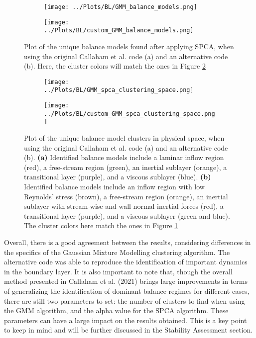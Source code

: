 \documentclass[12pt]{report} %
\begin{document}
\begin{figure}[htbp]
  \centering
  \begin{subfigure}[b]{0.45\textwidth}
      \texttt{[image: ../Plots/BL/GMM\_balance\_models.png]}
      \caption{}
  \end{subfigure}
  \hfill
  \begin{subfigure}[b]{0.45\textwidth}
      \texttt{[image: ../Plots/BL/custom\_GMM\_balance\_models.png]}
      \caption{}
  \end{subfigure}
  \caption{Plot of the unique balance models found after applying SPCA, when using the original Callaham et al. code (a) and an alternative code (b). Here, the cluster colors will match the ones in Figure \ref{fig:balance_model_clusters}}
  \label{fig:balance_models}
\end{figure}


\begin{figure}[htbp]
  \centering
  \begin{subfigure}[b]{0.7\textwidth}
      \texttt{[image: ../Plots/BL/GMM\_spca\_clustering\_space.png]}
      \caption{}
  \end{subfigure}
  \begin{subfigure}[b]{0.7\textwidth}
      \texttt{[image: ../Plots/BL/custom\_GMM\_spca\_clustering\_space.png]}
      \caption{}
  \end{subfigure}
  \caption{Plot of the unique balance model clusters in physical space, when using the original Callaham et al. code (a) and an alternative code (b). \textbf{(a)} Identified balance models include a laminar inflow region (red), a free-stream region (green), an inertial sublayer (orange), a transitional layer (purple), and a viscous sublayer (blue). \textbf{(b)} Identified balance models include an inflow region with low Reynolds' stress (brown), a free-stream region (orange), an inertial sublayer with stream-wise and wall normal inertial forces (red), a transitional layer (purple), and a viscous sublayer (green and blue). The cluster colors here match the ones in Figure \ref{fig:balance_models}}
  \label{fig:balance_model_clusters}
\end{figure}

Overall, there is a good agreement between the results, considering differences in the specifics of the Gaussian Mixture Modelling clustering algorithm. The alternative code was able to reproduce the identification of important dynamics in the boundary layer. It is also important to note that, though the overall method presented in Callaham et al. (2021)\cite{callaham2021learning} brings large improvements in terms of generalizing the identification of dominant balance regimes for different cases, there are still two parameters to set: the number of clusters to find when using the GMM algorithm, and the alpha value for the SPCA algorithm. These parameters can have a large impact on the results obtained. This is a key point to keep in mind and will be further discussed in the Stability Assessment section.
\end{document}

